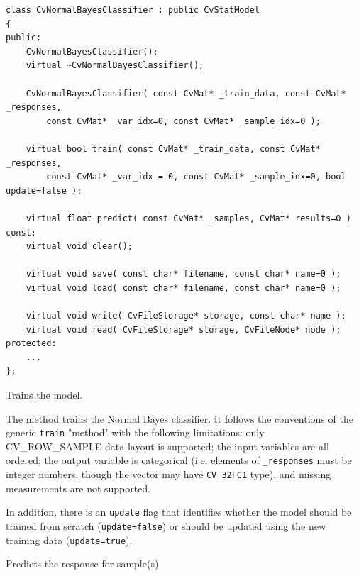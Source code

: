 \begin{lstlisting}
class CvNormalBayesClassifier : public CvStatModel
{
public:
    CvNormalBayesClassifier();
    virtual ~CvNormalBayesClassifier();

    CvNormalBayesClassifier( const CvMat* _train_data, const CvMat* _responses,
        const CvMat* _var_idx=0, const CvMat* _sample_idx=0 );

    virtual bool train( const CvMat* _train_data, const CvMat* _responses,
        const CvMat* _var_idx = 0, const CvMat* _sample_idx=0, bool update=false );

    virtual float predict( const CvMat* _samples, CvMat* results=0 ) const;
    virtual void clear();

    virtual void save( const char* filename, const char* name=0 );
    virtual void load( const char* filename, const char* name=0 );

    virtual void write( CvFileStorage* storage, const char* name );
    virtual void read( CvFileStorage* storage, CvFileNode* node );
protected:
    ...
};
\end{lstlisting}



Trains the model.


The method trains the Normal Bayes classifier. It follows the conventions of the generic \texttt{train} "method" with the following limitations: only CV\_ROW\_SAMPLE data layout is supported; the input variables are all ordered; the output variable is categorical (i.e. elements of \texttt{\_responses} must be integer numbers, though the vector may have \texttt{CV\_32FC1} type), and missing measurements are not supported.

In addition, there is an \texttt{update} flag that identifies whether the model should be trained from scratch (\texttt{update=false}) or should be updated using the new training data (\texttt{update=true}).

Predicts the response for sample(s)

